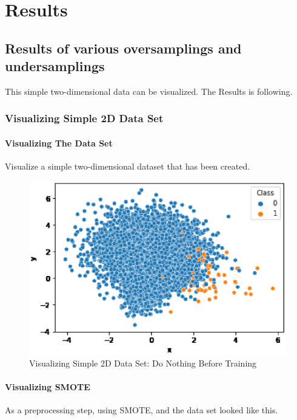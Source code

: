 \chapter{Results}

\section{Results of various oversamplings and undersamplings}
This simple two-dimensional data can be visualized. The Results is following.

\subsection{Visualizing Simple 2D Data Set}
\subsubsection{Visualizing The Data Set}
Visualize a simple two-dimensional dataset that has been created.

\begin{center}
    \begin{figure}[ht]
        \caption{Visualizing Simple 2D Data Set: Do Nothing Before Training}
        \label{tab:team-rating-features}
        \begin{center}
            \includegraphics[scale=0.6]{image/no-prepro.eps}
        \end{center}
    \end{figure}
\end{center}

\clearpage
\subsubsection{Visualizing SMOTE}
As a preprocessing step, using SMOTE, and the data set looked like this.

